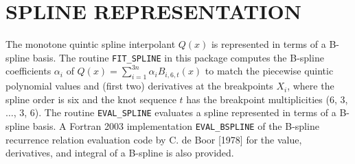 
\section{SPLINE REPRESENTATION}
The monotone quintic spline interpolant $Q(x)$ is represented in terms
of a B-spline basis. The routine {\tt FIT\_SPLINE} in this package
computes the B-spline coefficients $\alpha_i$ of $Q(x)=\sum_{i=1}^{3n}
\alpha_i B_{i,6,t}(x)$ to match the piecewise quintic polynomial
values and (first two) derivatives at the breakpoints $X_i$, where the
spline order is six and the knot sequence $t$ has the breakpoint
multiplicities (6, 3, $\ldots$, 3, 6).  The routine {\tt EVAL\_SPLINE}
evaluates a spline represented in terms of a B-spline basis. A Fortran
2003 implementation {\tt EVAL\_BSPLINE} of the B-spline recurrence
relation evaluation code by C. de Boor [1978] for the value,
derivatives, and integral of a B-spline is also provided.
